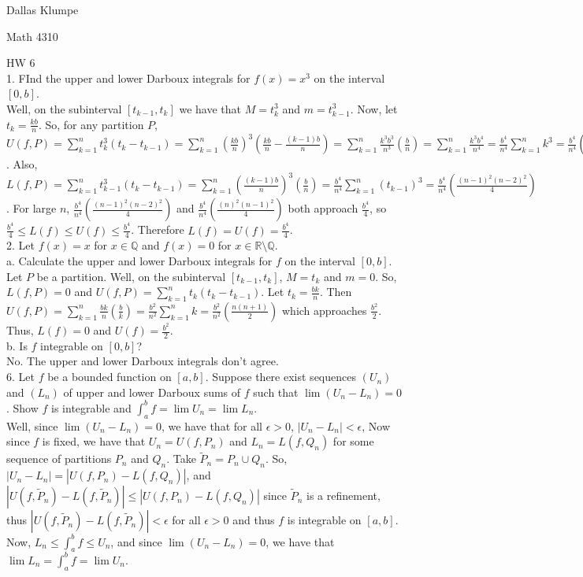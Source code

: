 \documentclass[12pt]{article}
\begin{document}
\noindent Dallas Klumpe

\noindent Math 4310

\noindent HW 6\\

1. FInd the upper and lower Darboux integrals for $f(x)=x^3$ on the interval $[0,b]$.\\
Well, on the subinterval $[t_{k-1},t_k]$ we have that $M=t_k^3$ and $m=t_{k-1}^3$. Now, let $t_k=\frac{kb}{n}$. So, for any partition $P$, $U(f,P)=\sum_{k=1}^nt_k^3(t_k-t_{k-1})=\sum_{k=1}^n(\frac{kb}{n})^3(\frac{kb}{n}-\frac{(k-1)b}{n})=\sum_{k=1}^n\frac{k^3b^3}{n^3}(\frac{b}{n})=\sum_{k=1}^n\frac{k^3b^4}{n^4}=\frac{b^4}{n^4}\sum_{k=1}^nk^3=\frac{b^4}{n^4}(\frac{n^2(n-1)^2}{4})$. Also, $L(f,P)=\sum_{k=1}^nt_{k-1}^3(t_k-t_{k-1})=\sum_{k=1}^n(\frac{(k-1)b}{n})^3(\frac{b}{n})=\frac{b^4}{n^4}\sum_{k=1}^n(t_{k-1})^3=\frac{b^4}{n^4}(\frac{(n-1)^2(n-2)^2}{4})$. For large $n$, $\frac{b^4}{n^4}(\frac{(n-1)^2(n-2)^2}{4})$ and $\frac{b^4}{n^4}(\frac{(n)^2(n-1)^2}{4})$ both approach $\frac{b^4}{4}$, so $\frac{b^4}{4}\leq L(f)\leq U(f)\leq\frac{b^4}{4}$. Therefore $L(f)=U(f)=\frac{b^4}{4}$.\\[20pt]

2. Let $f(x)=x$ for $x\in\mathbb{Q}$ and $f(x)=0$ for $x\in\mathbb{R}\setminus\mathbb{Q}$.\\
a. Calculate the upper and lower Darboux integrals for $f$ on the interval $[0,b]$.\\
Let $P$ be a partition. Well, on the subinterval $[t_{k-1},t_k]$, $M=t_k$ and $m=0$. So, $L(f,P)=0$ and $U(f,P)=\sum_{k=1}^nt_k(t_k-t_{k-1})$. Let $t_k=\frac{bk}{n}$. Then $U(f,P)=\sum_{k=1}^n\frac{bk}{n}(\frac{b}{k})=\frac{b^2}{n^2}\sum_{k=1}^nk=\frac{b^2}{n^2}(\frac{n(n+1)}{2})$ which approaches $\frac{b^2}{2}$. Thus, $L(f)=0$ and $U(f)=\frac{b^2}{2}$.\\
b. Is $f$ integrable on $[0,b]$?\\
No. The upper and lower Darboux integrals don't agree.\\[20pt]

6. Let $f$ be a bounded function on $[a,b]$. Suppose there exist sequences $(U_n)$ and $(L_n)$ of upper and lower Darboux sums of $f$ such that $\lim(U_n-L_n)=0$. Show $f$ is integrable and $\int_a^bf=\lim U_n=\lim L_n$.\\
Well, since $\lim(U_n-L_n)=0$, we have that for all $\epsilon>0$, $|U_n-L_n|<\epsilon$, Now since $f$ is fixed, we have that $U_n=U(f,P_n)$ and $L_n=L(f,Q_n)$ for some sequence of partitions $P_n$ and $Q_n$. Take $\tilde{P}_n=P_n\cup Q_n$. So, $|U_n-L_n|=|U(f,P_n)-L(f,Q_n)|$, and $|U(f,\tilde{P}_n)-L(f,\tilde{P}_n)|\leq|U(f,P_n)-L(f,Q_n)|$ since $\tilde{P}_n$ is a refinement, thus $|U(f,\tilde{P}_n)-L(f,\tilde{P}_n)|<\epsilon$ for all $\epsilon>0$ and thus $f$ is integrable on $[a,b]$. Now, $L_n\leq\int_a^bf\leq U_n$, and since $\lim(U_n-L_n)=0$, we have that $\lim L_n=\int_a^bf=\lim U_n$.\\[20pt]
\end{document}
